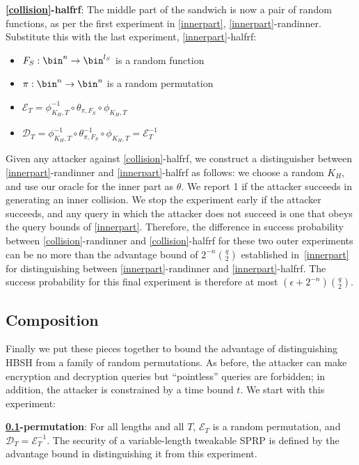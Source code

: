 \documentclass[journal=tosc,preprint,floatrow,submission]{iacrtrans}
\newcommand*{\xprm}[2]{\textsf{\ref*{#1}-#2}}
\newcommand*{\xprmtitle}[2]{\textbf{\xprm{#1}{#2}}}
\newcommand*{\calE}{\mathcal{E}}
\newcommand*{\calD}{\mathcal{D}}
\begin{document}
\xprmtitle{collision}{halfrf}: The middle part of the sandwich is now a pair of random functions,
as per the first experiment in \autoref{innerpart}, \xprm{innerpart}{randinner}.
Substitute this with the last experiment, \xprm{innerpart}{halfrf}:

\begin{itemize}
    \item $F_S: \bin^n \rightarrow \bin^{l_S}$ is a random function
    \item $\pi: \bin^n \rightarrow \bin^n$ is a random permutation
    \item $\calE_T = \phi^{-1}_{K_H, T} \circ \theta_{\pi, F_S} \circ \phi_{K_H, T}$
    \item $\calD_T = \phi^{-1}_{K_H, T} \circ \theta_{\pi, F_S}^{-1} \circ \phi_{K_H, T} = \calE_T^{-1}$
\end{itemize}

Given any attacker against \xprm{collision}{halfrf},
we construct a distinguisher between \xprm{innerpart}{randinner} and \xprm{innerpart}{halfrf} as
follows: we choose a random $K_H$, and use our oracle for the inner part as $\theta$.
We report 1 if the attacker succeeds in generating an inner collision.
We stop the experiment early if the attacker succeeds, and any query in which the attacker
does not succeed is one that obeys the query bounds of \autoref{innerpart}.
Therefore, the difference in success probability
between \xprm{collision}{randinner} and \xprm{collision}{halfrf}
for these two outer experiments can be no more than
the advantage bound of $2^{-n}\binom{q}{2}$
established in~\autoref{innerpart} for distinguishing between
\xprm{innerpart}{randinner} and \xprm{innerpart}{halfrf}.
The success
probability for this final experiment is therefore at most
$(\epsilon + 2^{-n})\binom{q}{2}$.

\subsection{Composition}\label{composition}

Finally we put these pieces together to bound the advantage of distinguishing HBSH from
a family of random permutations. As before, the attacker can make encryption and decryption queries
but ``pointless'' queries are forbidden; in addition, the attacker is constrained by a time
bound $t$. We start with this experiment:

\xprmtitle{composition}{permutation}: For all lengths and all $T$, $\calE_T$ is a random permutation,
and $\calD_T = \calE_T^{-1}$. The security of a variable-length tweakable SPRP is defined by
the advantage bound in distinguishing it from this experiment.
\end{document}
